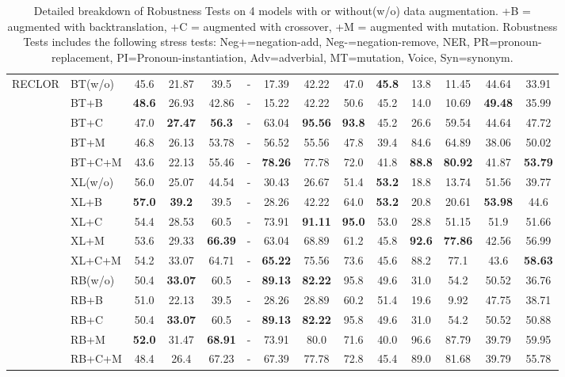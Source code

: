 \documentclass{ecai}  %
\begin{document}
\begin{multicols}{2}
\begin{center}
\begin{table}[H]
\begin{tabularx}{\textwidth}{ll|c|ccccccccccc}
	\midrule
\multirow{15}{*}{RECLOR} 

 		    
                &  BT(w/o) &45.6&21.87&39.5&-&17.39&42.22&47.0&\bf{45.8}&13.8&11.45&44.64&33.91
                						\\ 
		&  BT+B &\bf{48.6}&26.93&42.86&-&15.22&42.22&50.6&45.2&14.0&10.69&\bf{49.48}&35.99
 						        \\ 
		&  BT+C &47.0&\bf{27.47}&\bf{56.3}&-&63.04&\bf{95.56}&\bf{93.8}&45.2&26.6&59.54&44.64&47.72
 						        \\ 
		   & BT+M & 46.8&26.13&53.78&-&56.52&55.56&47.8&39.4&84.6&64.89&38.06&50.02
 						       \\ 
		   & BT+C+M& 43.6&22.13&55.46&-&\bf{78.26}&77.78&72.0&41.8&\bf{88.8}&\bf{80.92}&41.87&\bf{53.79}
		
 					     	       \\ \cmidrule{2-14}
		&  XL(w/o) &56.0&25.07&44.54&-&30.43&26.67&51.4&\bf{53.2}&18.8&13.74&51.56&39.77
                						\\ 
		&  XL+B & \bf{57.0}&\bf{39.2}&39.5&-&28.26&42.22&64.0&\bf{53.2}&20.8&20.61&\bf{53.98}&44.6
 						        \\ 
		&  XL+C & 54.4&28.53&60.5&-&73.91&\bf{91.11}&\bf{95.0}&53.0&28.8&51.15&51.9&51.66
							
 						        \\ 
		   & XL+M &53.6&29.33&\bf{66.39}&-&63.04&68.89&61.2&45.8&\bf{92.6}&\bf{77.86}&42.56 	&56.99				       \\ 
		   & XL+C+M& 54.2&33.07&64.71&-&\bf{65.22}&75.56&73.6&45.6&88.2&77.1&43.6&\bf{58.63}
 					     	       \\ \cmidrule{2-14}
	&  RB(w/o) & 50.4&\bf{33.07}&60.5&-&\bf{89.13}&\bf{82.22}&95.8&49.6&31.0&54.2&50.52&36.76
                						\\ 
		&  RB+B & 51.0&22.13&39.5&-&28.26&28.89&60.2&51.4&19.6&9.92&47.75&38.71
 						        \\ 
		&  RB+C & 50.4&\bf{33.07}&60.5&-&\bf{89.13}&\bf{82.22}&95.8&49.6&31.0&54.2&50.52&50.88
 						        \\ 
		   & RB+M &\bf{52.0}&31.47&\bf{68.91}&-&73.91&80.0&71.6&40.0&96.6&87.79&39.79&59.95
 						       \\ 
		   & RB+C+M&48.4&26.4&67.23&-&67.39&77.78&72.8&45.4&89.0&81.68&39.79&55.78
 					     	       \\ 


\bottomrule
\hline
\end{tabularx}
\caption{\label{tab:results} Detailed breakdown of Robustness Tests
on 4 models with or without(w/o) data augmentation. 
+B = augmented with backtranslation,
+C = augmented with crossover, +M = augmented with mutation. 
Robustness Tests includes the following stress tests: 
Neg+=negation-add, Neg-=negation-remove, NER, 
PR=pronoun-replacement, PI=Pronoun-instantiation, Adv=adverbial, MT=mutation, Voice, Syn=synonym.}
\end{table}
\end{center}
\end{multicols}
\end{document}
